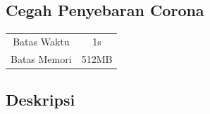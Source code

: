 \documentclass{article}
\begin{document}
\begin{center}
    \section*{Cegah Penyebaran Corona} %

    \begin{tabular}{ | c c | }
        \hline
        Batas Waktu  & 1s \\    %
        Batas Memori & 512MB \\  %
        \hline
    \end{tabular}
\end{center}

\subsection*{Deskripsi}
\end{document}
